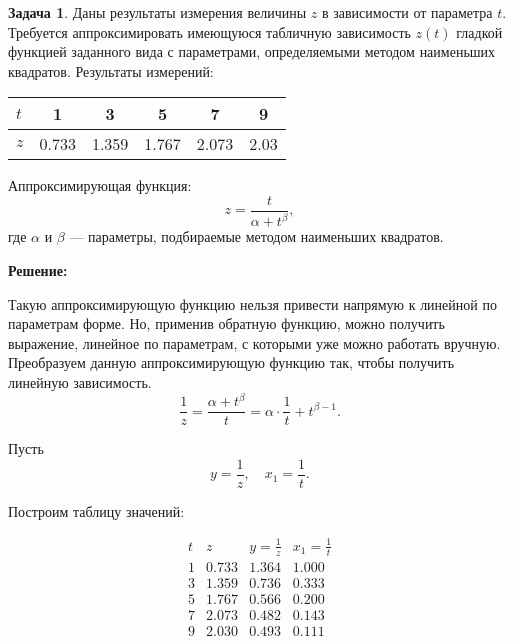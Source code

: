\documentclass[a4paper,11pt]{article}
\newenvironment{shdd}{\begin{mdframed}[backgroundcolor=shadecolor]}{\end{mdframed}}
\theoremstyle{definition}
\newtheorem{problem}{Задача}\setlength{\parindent}{0pt}
\newenvironment{solution}
{\begin{shdd}
     \textbf{Решение:}\par\setlength{\parindent}{0pt}}
     {
\end{shdd}}
\begin{document}
    \vspace{10pt}
    \begin{problem}
        Даны результаты измерения величины \( z \) в зависимости от параметра \( t \).
        Требуется аппроксимировать имеющуюся табличную зависимость \( z(t) \) гладкой функцией заданного вида с параметрами,
        определяемыми методом наименьших квадратов.
        Результаты измерений:

        \begin{table}[H]
            \centering
            \begin{adjustbox}{max width=\textwidth}
                \begin{tabular}{l c c c c c}
                    \toprule
                    \( t \) & 1 & 3 & 5 & 7 & 9 \\
                    \midrule
                    \( z \) & 0.733 & 1.359 & 1.767 & 2.073 & 2.03 \\
                    \bottomrule
                \end{tabular}
            \end{adjustbox}\label{tab:table3}
        \end{table}

        Аппроксимирующая функция:
        \[
        z = \frac{t}{\alpha + t^{\beta}},
        \]
        где \( \alpha \) и \( \beta \) — параметры, подбираемые методом наименьших квадратов.

        \begin{solution}
            Такую аппроксимирующую функцию нельзя привести напрямую к линейной по параметрам форме.
            Но, применив обратную функцию, можно получить выражение, линейное по параметрам, с которыми уже можно работать вручную.
            Преобразуем данную аппроксимирующую функцию так, чтобы получить линейную зависимость.
            \[
            \frac{1}{z} = \frac{\alpha + t^\beta}{t} = \alpha \cdot \frac{1}{t} + t^{\beta - 1}.
            \]

            Пусть
            \[
            y = \frac{1}{z}, \quad x_1 = \frac{1}{t}.
            \]

            Построим таблицу значений:

            \[
            \begin{array}{c|c|c|c}
            t & z & y = \frac{1}{z} & x_1 = \frac{1}{t} \\
            \hline
            1 & 0.733 & 1.364 & 1.000 \\
            3 & 1.359 & 0.736 & 0.333 \\
            5 & 1.767 & 0.566 & 0.200 \\
            7 & 2.073 & 0.482 & 0.143 \\
            9 & 2.030 & 0.493 & 0.111 \\
            \end{array}
            \]


\end{solution}
\end{problem}
\end{document}
